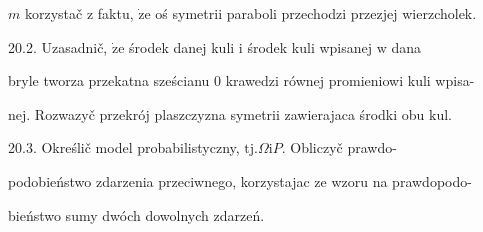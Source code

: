 \documentclass[a4paper,12pt]{article}
\begin{document}
$m$ korzystač $\mathrm{z}$ faktu, $\dot{\mathrm{z}}\mathrm{e}$ oś symetrii paraboli przechodzi przezjej wierzcholek.

20.2. Uzasadnič, $\dot{\mathrm{z}}\mathrm{e}$ środek danej kuli $\mathrm{i}$ środek kuli wpisanej $\mathrm{w}$ dana

bryle tworza przekatna sześcianu $0$ krawedzi równej promieniowi kuli wpisa-

nej. Rozwazyč przekrój plaszczyzna symetrii zawierajaca środki obu $\mathrm{k}\mathrm{u}\mathrm{l}.$

20.3. Określič model probabilistyczny, $\mathrm{t}\mathrm{j}. \Omega \mathrm{i} P$. Obliczyč prawdo-

podobieństwo zdarzenia przeciwnego, korzystajac ze wzoru na prawdopodo-

bieństwo sumy dwóch dowolnych zdarzeń.
\end{document}
